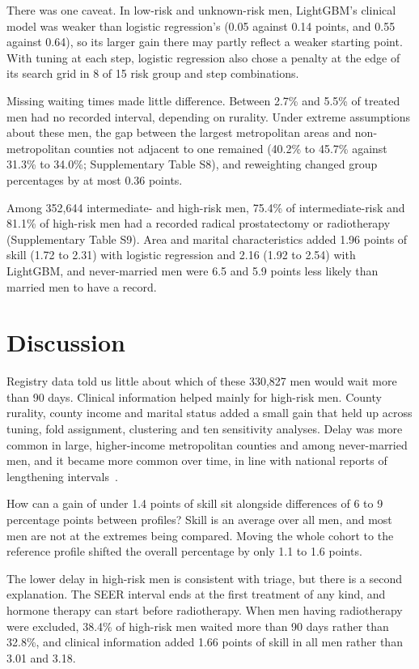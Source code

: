 \documentclass[10pt,a4paper,twocolumn]{article}
\begin{document}
There was one caveat. In low-risk and unknown-risk men, LightGBM's clinical model was weaker than logistic regression's (0.05 against 0.14 points, and 0.55 against 0.64), so its larger gain there may partly reflect a weaker starting point. With tuning at each step, logistic regression also chose a penalty at the edge of its search grid in 8 of 15 risk group and step combinations.

Missing waiting times made little difference. Between 2.7\% and 5.5\% of treated men had no recorded interval, depending on rurality. Under extreme assumptions about these men, the gap between the largest metropolitan areas and non-metropolitan counties not adjacent to one remained (40.2\% to 45.7\% against 31.3\% to 34.0\%; Supplementary Table S8), and reweighting changed group percentages by at most 0.36 points.

Among 352,644 intermediate- and high-risk men, 75.4\% of intermediate-risk and 81.1\% of high-risk men had a recorded radical prostatectomy or radiotherapy (Supplementary Table S9). Area and marital characteristics added 1.96 points of skill (1.72 to 2.31) with logistic regression and 2.16 (1.92 to 2.54) with LightGBM, and never-married men were 6.5 and 5.9 points less likely than married men to have a record.

\section{Discussion}

Registry data told us little about which of these 330,827 men would wait more than 90 days. Clinical information helped mainly for high-risk men. County rurality, county income and marital status added a small gain that held up across tuning, fold assignment, clustering and ten sensitivity analyses. Delay was more common in large, higher-income metropolitan counties and among never-married men, and it became more common over time, in line with national reports of lengthening intervals~\cite{khorana2019}.

How can a gain of under 1.4 points of skill sit alongside differences of 6 to 9 percentage points between profiles? Skill is an average over all men, and most men are not at the extremes being compared. Moving the whole cohort to the reference profile shifted the overall percentage by only 1.1 to 1.6 points.

The lower delay in high-risk men is consistent with triage, but there is a second explanation. The SEER interval ends at the first treatment of any kind, and hormone therapy can start before radiotherapy. When men having radiotherapy were excluded, 38.4\% of high-risk men waited more than 90 days rather than 32.8\%, and clinical information added 1.66 points of skill in all men rather than 3.01 and 3.18.
\end{document}
